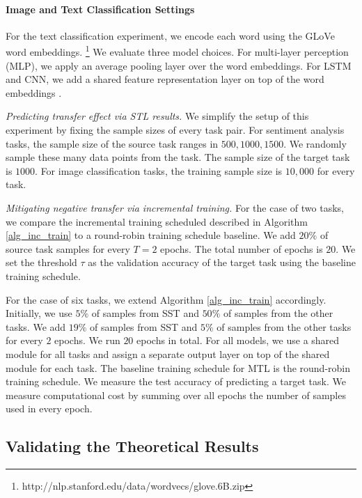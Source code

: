 \paragraph{Image and Text Classification Settings}\label{app_it}

For the text classification experiment, we encode each word using the GLoVe word embeddings.%
\footnote{http://nlp.stanford.edu/data/wordvecs/glove.6B.zip}
We evaluate three model choices.
For multi-layer perception (MLP), we apply an average pooling layer over the word embeddings.
For LSTM and CNN, we add a shared feature representation layer on top of the word embeddings \cite{lei2018simple}.

\textit{Predicting transfer effect via STL results.}
We simplify the setup of this experiment by fixing the sample sizes of every task pair.
For sentiment analysis tasks, the sample size of the source task ranges in $500, 1000, 1500$.
We randomly sample these many data points from the task.
The sample size of the target task is $1000$.
For image classification tasks, the training sample size is $10,000$ for every task.

\textit{Mitigating negative transfer via incremental training.}
For the case of two tasks, we compare the incremental training scheduled described in Algorithm \ref{alg_inc_train}  to a round-robin training schedule baseline.
We add $20\%$ of source task samples for every $T = 2$ epochs.
The total number of epochs is $20$.
We set the threshold $\tau$ as the validation accuracy of the target task using the baseline training schedule.

For the case of six tasks, we extend Algorithm \ref{alg_inc_train} accordingly.
Initially, we use $5\%$ of samples from SST and $50\%$ of samples from the other tasks.
We add $19\%$ of samples from SST and $5\%$ of samples from the other tasks for every $2$ epochs.
We run $20$ epochs in total.
For all models, we use a shared module for all tasks and assign a separate output layer on top of the shared module for each task.
The baseline training schedule for MTL is the round-robin training schedule.
We measure the test accuracy of predicting a target task.
We measure computational cost by summing over all epochs the number of samples used in every epoch.


\subsection{Validating the Theoretical Results}\label{sec_exp_ab}

